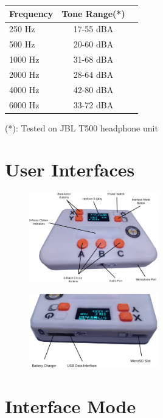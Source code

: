 \documentclass[a4paper,12pt,oneside,pdflatex,italian,final,twocolumn]{article}
\begin{document}
\centering
\begin{tabular}{lcr}
\toprule
  Frequency & Tone Range(*) \\
\midrule
250 Hz & 17-55 dBA \\
500 Hz & 20-60 dBA \\
1000 Hz & 31-68 dBA \\
2000 Hz & 28-64 dBA \\
4000 Hz & 42-80 dBA \\
6000 Hz & 33-72 dBA \\
\bottomrule
\end{tabular}

(*): Tested on JBL T500 headphone unit



\raggedright
\section{User Interfaces}
\centering
\begin{figure} [h]
\centering
\includegraphics[width=0.5\textwidth,]{images/useriface.png}
\end{figure}

\begin{figure} [h]
\centering
\includegraphics[width=0.5\textwidth,]{images/portuser.png}
\end{figure}

\raggedright
\section{Interface Mode}
\end{document}
